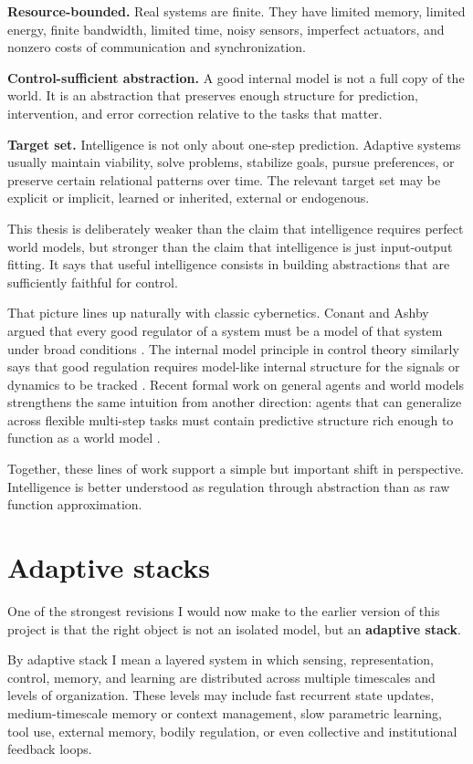 \documentclass[11pt]{article}
\begin{document}
\textbf{Resource-bounded.} Real systems are finite. They have limited memory, limited energy, finite bandwidth, limited time, noisy sensors, imperfect actuators, and nonzero costs of communication and synchronization.

\textbf{Control-sufficient abstraction.} A good internal model is not a full copy of the world. It is an abstraction that preserves enough structure for prediction, intervention, and error correction relative to the tasks that matter.

\textbf{Target set.} Intelligence is not only about one-step prediction. Adaptive systems usually maintain viability, solve problems, stabilize goals, pursue preferences, or preserve certain relational patterns over time. The relevant target set may be explicit or implicit, learned or inherited, external or endogenous.

This thesis is deliberately weaker than the claim that intelligence requires perfect world models, but stronger than the claim that intelligence is just input-output fitting. It says that useful intelligence consists in building abstractions that are sufficiently faithful for control.

That picture lines up naturally with classic cybernetics. Conant and Ashby argued that every good regulator of a system must be a model of that system under broad conditions \citep{conant1970}. The internal model principle in control theory similarly says that good regulation requires model-like internal structure for the signals or dynamics to be tracked \citep{francis1976}. Recent formal work on general agents and world models strengthens the same intuition from another direction: agents that can generalize across flexible multi-step tasks must contain predictive structure rich enough to function as a world model \citep{richens2025}.

Together, these lines of work support a simple but important shift in perspective. Intelligence is better understood as regulation through abstraction than as raw function approximation.

\section{Adaptive stacks}


One of the strongest revisions I would now make to the earlier version of this project is that the right object is not an isolated model, but an \textbf{adaptive stack}.

By adaptive stack I mean a layered system in which sensing, representation, control, memory, and learning are distributed across multiple timescales and levels of organization. These levels may include fast recurrent state updates, medium-timescale memory or context management, slow parametric learning, tool use, external memory, bodily regulation, or even collective and institutional feedback loops.
\end{document}
